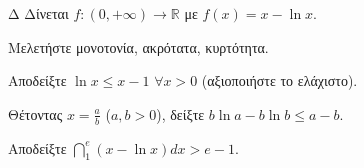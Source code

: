\begin{thema}{Δ}
Δίνεται $f:(0,+\infty)\to\mathbb{R}$ με $f(x)=x-\ln x$.
\begin{erwthma}
    \item Μελετήστε μονοτονία, ακρότατα, κυρτότητα. 
    \item Αποδείξτε $\ln x \leq x - 1$ $\forall x > 0$ (αξιοποιήστε το ελάχιστο). 
    \item Θέτοντας $x = \frac{a}{b}$ ($a,b>0$), δείξτε $b\ln a - b\ln b \leq a - b$. 
    \item Αποδείξτε $\dint_1^e (x-\ln x)dx > e - 1$. 
\end{erwthma}
\end{thema}
